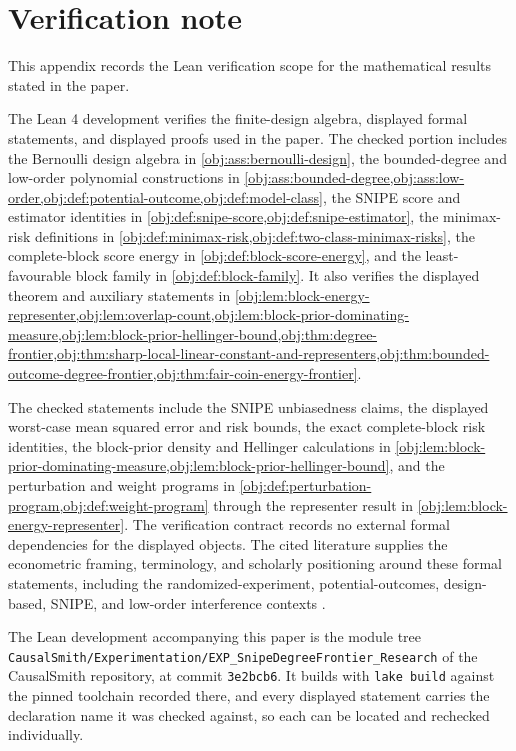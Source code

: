 \documentclass[11pt]{article}
\begin{document}
\section{Verification note}

This appendix records the Lean verification scope for the mathematical results stated in the paper.

The Lean 4 development verifies the finite-design algebra, displayed formal statements, and displayed proofs used in the paper. The checked portion includes the Bernoulli design algebra in \cref{obj:ass:bernoulli-design}, the bounded-degree and low-order polynomial constructions in \cref{obj:ass:bounded-degree,obj:ass:low-order,obj:def:potential-outcome,obj:def:model-class}, the SNIPE score and estimator identities in \cref{obj:def:snipe-score,obj:def:snipe-estimator}, the minimax-risk definitions in \cref{obj:def:minimax-risk,obj:def:two-class-minimax-risks}, the complete-block score energy in \cref{obj:def:block-score-energy}, and the least-favourable block family in \cref{obj:def:block-family}. It also verifies the displayed theorem and auxiliary statements in \cref{obj:lem:block-energy-representer,obj:lem:overlap-count,obj:lem:block-prior-dominating-measure,obj:lem:block-prior-hellinger-bound,obj:thm:degree-frontier,obj:thm:sharp-local-linear-constant-and-representers,obj:thm:bounded-outcome-degree-frontier,obj:thm:fair-coin-energy-frontier}.

The checked statements include the SNIPE unbiasedness claims, the displayed worst-case mean squared error and risk bounds, the exact complete-block risk identities, the block-prior density and Hellinger calculations in \cref{obj:lem:block-prior-dominating-measure,obj:lem:block-prior-hellinger-bound}, and the perturbation and weight programs in \cref{obj:def:perturbation-program,obj:def:weight-program} through the representer result in \cref{obj:lem:block-energy-representer}. The verification contract records no external formal dependencies for the displayed objects. The cited literature supplies the econometric framing, terminology, and scholarly positioning around these formal statements, including the randomized-experiment, potential-outcomes, design-based, SNIPE, and low-order interference contexts \citep{HorvitzThompson1952,Rubin1978,ImbensRubin2015,Aronow2017,CortezRodriguezEichhornYu2023,HarshawSavjeWang2025}.

The Lean development accompanying this paper is the module tree \texttt{CausalSmith/Experimentation/EXP\_SnipeDegreeFrontier\_Research} of the CausalSmith repository, at commit \texttt{3e2bcb6}. It builds with \texttt{lake build} against the pinned toolchain recorded there, and every displayed statement carries the declaration name it was checked against, so each can be located and rechecked individually.
\end{document}
